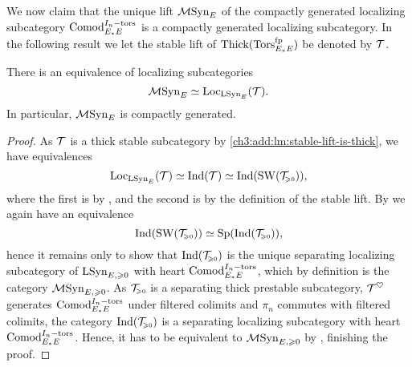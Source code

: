 We now claim that the unique lift $\MSynE$ of the compactly generated localizing subcategory $\Comodt$ is a compactly generated localizing subcategory. In the following result we let the stable lift of $\Thick(\TorsE)$ be denoted by $\T$. 

\begin{theorem}
    There is an equivalence of localizing subcategories 
    \[\MSynE \simeq \Loc_{\LSynE}(\T).\] 
    In particular, $\MSynE$ is compactly generated. 
\end{theorem}
\begin{proof}
    As $\T$ is a thick stable subcategory by \cref{ch3:add:lm:stable-lift-is-thick}, we have equivalences 
    \[\Loc_{\LSynE}(\T)\simeq \Ind(\T)\simeq \Ind(\SW(\T\geqz)),\]
    where the first is by \cite[2.15]{barthel-heard-valenzuela_2018}, and the second is by the definition of the stable lift. By \cite[C.1.1.6]{lurie_SAG} we again have an equivalence
    \[\Ind(\SW(\T\geqz)) \simeq \Sp(\Ind(\T\geqz)),\]
    hence it remains only to show that $\Ind(\T\geqz)$ is the unique separating localizing subcategory of $\LSyn_{E, \geq 0}$ with heart $\Comodt$, which by definition is the category $\MSyn_{E, \geq 0}$. As $\T\geqz$ is a separating thick prestable subcategory, $\T^\heart$ generates $\Comodt$ under filtered colimits and $\pi_n$ commutes with filtered colimits, the category $\Ind(\T\geqz)$ is a separating localizing subcategory with heart $\Comodt$. Hence, it has to be equivalent to $\MSyn_{E, \geq 0}$ by \cite[C.5.2.5, C.5.2.6]{lurie_SAG}, finishing the proof. 
\end{proof}


    


